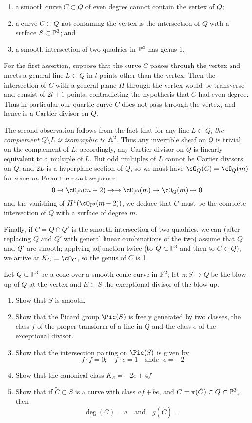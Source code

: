 \begin{enumerate}
\item a smooth curve $C \subset Q$ of even degree cannot contain the vertex of $Q$;
\item a curve $C \subset Q$ not containing the vertex is the intersection of $Q$ with a surface $S \subset \PP^3$; and
\item a smooth  intersection of two quadrics in $\PP^3$ has genus 1.
\end{enumerate}

For the first assertion, suppose that the curve $C$ passes through the vertex and meets a general line $L \subset Q$ in $l$ points other than the vertex. Then the intersection of $C$ with a general plane $H$ through the vertex would be transverse and consist of $2l+1$ points, contradicting the hypothesis that $C$ had even degree. Thus in particular our quartic curve $C$ does not pass through the vertex, and hence is a Cartier divisor on $Q$.

The second observation follows from the fact that for any line $L \subset Q$, \emph{the complement $Q \setminus L$ is isomorphic to $\AA^2$}. Thus any invertible sheaf on $Q$ is trivial on the complement of $L$; accordingly, any Cartier divisor on $Q$ is linearly equivalent to a multiple of $L$. But odd multiples of $L$ cannot be Cartier divisors on $Q$, and $2L$ is a hyperplane section of $Q$, so we must have $\cO_Q(C) = \cO_Q(m)$ for some $m$. From the exact sequence
$$
0 \to \cO_{\PP^3}(m-2) \to \to \cO_{\PP^3}(m) \to \cO_{Q}(m)  \to 0
$$
and the vanishing of $H^1(\cO_{\PP^3}(m-2))$, we deduce that $C$ must be the complete intersection of $Q$ with a surface of degree $m$.

Finally, if $C = Q \cap Q'$ is the smooth intersection of two quadrics, we can (after replacing $Q$ and $Q'$ with general linear combinations of the two) assume that $Q$ and $Q'$ are smooth; applying adjunction twice (to $Q \subset \PP^3$ and then to $C \subset Q$), we arrive at $K_C = \cO_C$, so the genus of $C$ is 1.

\begin{exercise}\label{F2}
Let $Q \subset \PP^3$ be a cone over a smooth conic curve in $\PP^2$; let $\pi : S \to Q$ be the blow-up of $Q$ at the vertex and $E \subset S$ the exceptional divisor of the blow-up.
\begin{enumerate}
\item Show that $S$ is smooth.
\item Show that the Picard group $\Pic(S)$ is freely generated by two classes, the class $f$ of the proper transform of a line in $Q$ and the class $e$ of the exceptional divisor.
\item Show that the intersection pairing on $\Pic(S)$ is given by
$$
f \cdot f = 0; \quad f \cdot e = 1 \quad \text{and} e \cdot e = -2
$$
\item Show that the canonical class $K_S = -2e+4f$
\item Show that if $\tilde C \subset S$ is a curve with class $af + be$, and
$C = \pi(\tilde C) \subset Q \subset \PP^3$, then
$$
\deg(C) = a \quad \text{and} \quad g(\tilde C) = 
$$
\end{enumerate}
\end{exercise}

